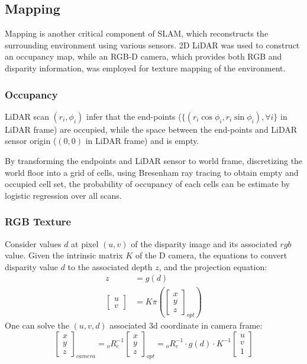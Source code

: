 \documentclass[conference]{IEEEtran}
\begin{document}
\subsection{Mapping}
Mapping is another critical component of SLAM, 
which reconstructs the surrounding environment using various sensors.
2D LiDAR was used to construct an occupancy map, 
while an RGB-D camera, which provides both RGB and disparity information,
was employed for texture mapping of the environment.

\subsubsection{Occupancy}
LiDAR scan $(r_i, \phi_i)$ infer that 
the end-points ($\{(r_i\cos\phi_i, r_i\sin\phi_i), \forall i\}$ in LiDAR frame) are occupied,
while the space between the end-points and LiDAR sensor origin 
($(0, 0)$ in LiDAR frame) and is empty.

By transforming the endpoints and LiDAR sensor to world frame,
discretizing the world floor into a grid of cells,
using Bresenham ray tracing to obtain empty and occupied cell set,
the probability of occupancy of each cells can be estimate by
logistic regression over all scans.

\subsubsection{RGB Texture}
Consider values $d$ at pixel $(u, v)$ of the disparity image 
and its associated $rgb$ value.
Given the intrinsic matrix $K$ of the D camera, 
the equations to convert disparity value $d$ to the associated depth $z$,
and the projection equation:
$$
\begin{aligned}
    z&=g(d)\\ 
    \left[ \begin{gathered}u\\ v\end{gathered} \right]  &=K\pi \left( \left[ \begin{gathered}x\\ y\\ z\end{gathered} \right]_{opt}  \right)  
\end{aligned}
$$
One can solve the $(u, v, d)$ associated 3d coordinate in camera frame:
$$
\left[ \begin{gathered}x\\ y\\ z\end{gathered} \right]_{camera}
= {}_oR_c^{-1}  \left[ \begin{gathered}x\\ y\\ z\end{gathered} \right]_{opt}  
= {}_oR_c^{-1} \cdot g(d) \cdot K^{-1} \left[ \begin{gathered}u\\ v\\ 1\end{gathered} \right]
$$
\end{document}
